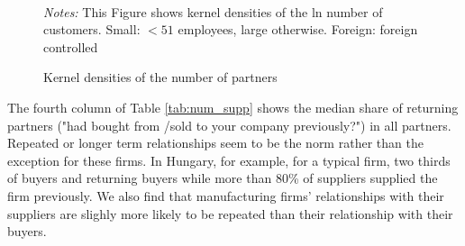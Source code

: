 \documentclass[final, dvipsnames, authoryear,12pt]{elsarticle}
\begin{document}
\begin{figure}[!h]
    \caption{Kernel densities of the number of partners}
    \label{fig:kernel} 
    \begin{center}    
    \\
     \end{center}    
        {\footnotesize \textit{Notes:} This Figure shows kernel densities of the ln number of customers. Small: $< 51$ employees, large otherwise. Foreign: foreign controlled} 
\end{figure}




The fourth column of Table \ref{tab:num_supp} shows the median share of returning partners ("had bought from /sold to your company previously?")  in all partners. Repeated or longer term relationships seem to be the norm rather than the exception for these firms. In Hungary, for example, for a typical firm, two thirds of buyers and returning buyers while more than 80\% of suppliers supplied the firm previously. We also find that manufacturing firms' relationships with their suppliers are slighly more likely to be repeated than their relationship with their buyers.
\end{document}
